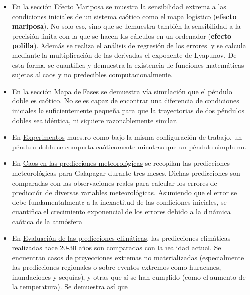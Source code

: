 \documentclass[
  10pt,
  a4paper,
  DIV=11,
  numbers=noendperiod,
  open=any]{scrreprt}
\numberwithin{equation}{chapter}
\numberwithin{equation}{section}
\renewcommand{\[}{\begin{equation}}
\renewcommand{\]}{\end{equation}}
\begin{document}
\begin{itemize}
\item
  En la sección
  \href{https://colacaos.github.io/ColaCAOS/01-logistica/lyapunov.html}{Efecto
  Mariposa} se muestra la sensibilidad extrema a las condiciones
  iniciales de un sistema caótico como el mapa logístico (\textbf{efecto
  mariposa}). No solo eso, sino que se demuestra también la sensibilidad
  a la precisión finita con la que se hacen los cálculos en un ordenador
  (\textbf{efecto polilla}). Además se realiza el análisis de regresión
  de los errores, y se calcula mediante la multiplicación de las
  derivadas el exponente de Lyapunov. De esta forma, se cuantifica y
  demuestra la existencia de funciones matemáticas sujetas al caos y no
  predecibles computacionalmente.
\item
  En la sección
  \href{https://colacaos.github.io/ColaCAOS/02-pendulo-doble/fractal.html}{Mapa
  de Fases} se demuestra vía simulación que el péndulo doble es caótico.
  No se es capaz de encontrar una diferencia de condiciones iniciales lo
  suficientemente pequeña para que la trayectorias de dos péndulos
  dobles sea idéntica, ni siquiere razonablemente similar. 
\item
  En
  \href{https://colacaos.github.io/ColaCAOS/02-pendulo-doble/experimentos.html}{Experimentos}
  muestro como bajo la misma configuración de trabajo, un péndulo doble
  se comporta caóticamente mientras que un péndulo simple no.
\item
  En
  \href{https://colacaos.github.io/ColaCAOS/03-meteorologia/predicciones.html}{Caos
  en las predicciones meteorológicas} se recopilan las predicciones
  meteorológicas para Galapagar durante tres meses. Dichas predicciones
  son comparadas con las observaciones reales para calcular los errores
  de predicción de diversas variables meteorológicas. Asumiendo que el
  error se debe fundamentalmente a la inexactitud de las condiciones
  iniciales, se cuantifica el crecimiento exponencial de los errores
  debido a la dinámica caótica de la atmósfera.
\item
  En
  \href{https://colacaos.github.io/ColaCAOS/04-clima/evaluacion.html}{Evaluación
  de las predicciones climáticas}, las predicciones climáticas
  realizadas hace 20-30 años son comparadas con la realidad actual. Se
  encuentran casos de proyecciones extremas no materializadas
  (especialmente las predicciones regionales o sobre eventos extremos
  como huracanes, inundaciones y sequías), y otras que sí se han
  cumplido (como el aumento de la temperatura). Se demuestra así que

\end{itemize}
\end{document}
